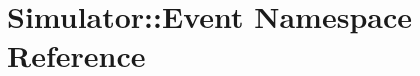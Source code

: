 \hypertarget{namespace_simulator_1_1_event}{\section{Simulator\+:\+:Event Namespace Reference}
\label{namespace_simulator_1_1_event}
}
